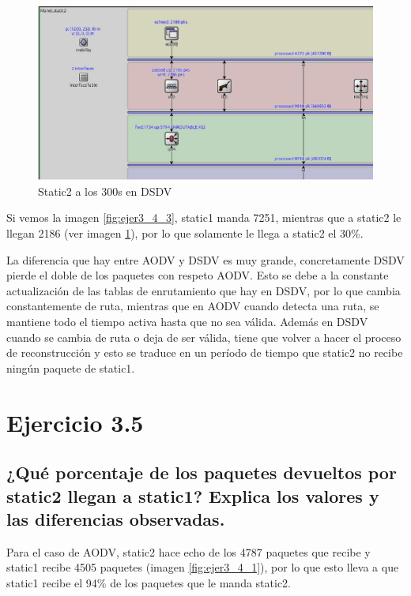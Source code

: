 \begin{figure}[H]
    \centering
    \includegraphics[width=155mm, scale=0.75]{imaxes/aodv_dsdv/ejercicio3_4_static2_dsdv.png}
    \caption{Static2 a los 300s en DSDV}
    \label{fig:ejer3_4_4}
\end{figure}

Si vemos la imagen \ref{fig:ejer3_4_3}, static1 manda 7251, mientras que a static2 le llegan 2186 (ver imagen \ref{fig:ejer3_4_4}), por lo que solamente le llega a static2 el 30\%.

La diferencia que hay entre AODV y DSDV es muy grande, concretamente DSDV pierde el doble de los paquetes con respeto AODV. Esto se debe a la constante actualización de las tablas de enrutamiento que hay en DSDV, por lo que cambia constantemente de ruta, mientras que en AODV cuando detecta una ruta, se mantiene todo el tiempo activa hasta que no sea válida. Además en DSDV cuando se cambia de ruta o deja de ser válida, tiene que volver a hacer el proceso de reconstrucción y esto se traduce en un período de tiempo que static2 no recibe ningún paquete de static1. 


\section{Ejercicio 3.5}

\subsection{¿Qué porcentaje de los paquetes devueltos por static2 llegan a static1? Explica los valores y las diferencias
observadas.}

Para el caso de AODV, static2 hace echo de los 4787 paquetes que recibe y static1 recibe 4505 paquetes (imagen \ref{fig:ejer3_4_1}), por lo que esto lleva a que static1 recibe el 94\% de los paquetes que le manda static2.

